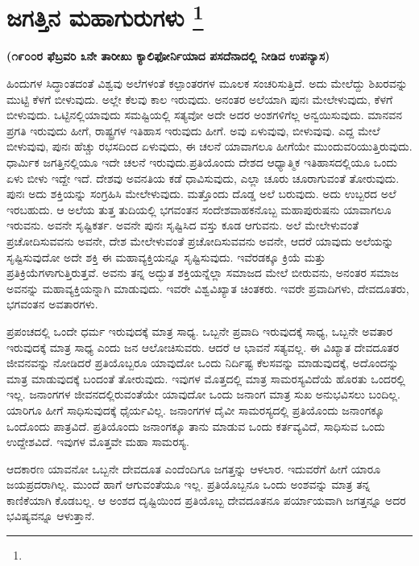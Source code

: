 
\chapter[ಜಗತ್ತಿನ ಮಹಾಗುರುಗಳು]{ಜಗತ್ತಿನ ಮಹಾಗುರುಗಳು \protect\footnote{}}

\begin{center}
\textbf{(೧೯೦೦ರ ಫೆಬ್ರವರಿ ೩ನೇ ತಾರೀಖು ಕ್ಯಾಲಿಫೋರ್ನಿಯಾದ ಪಸದೆನಾದಲ್ಲಿ ನೀಡಿದ ಉಪನ್ಯಾಸ)}
\end{center}

ಹಿಂದುಗಳ ಸಿದ್ಧಾಂತದಂತೆ ವಿಶ್ವವು ಅಲೆಗಳಂತೆ ಕಲ್ಪಾಂತರಗಳ ಮೂಲಕ ಸಂಚರಿಸು\-ತ್ತಿದೆ. ಅದು ಮೇಲೆದ್ದು ಶಿಖರವನ್ನು ಮುಟ್ಟಿ ಕೆಳಗೆ ಬೀಳುವುದು. ಅಲ್ಲೇ ಕೆಲವು ಕಾಲ ಇರುವುದು. ಅನಂತರ ಅಲೆಯಾಗಿ ಪುನಃ ಮೇಲೇಳುವುದು, ಕೆಳಗೆ ಬೀಳುವುದು. ಒಟ್ಟಿನಲ್ಲಿ\break ಯಾವುದು ಸಮಷ್ಟಿಯಲ್ಲಿ ಸತ್ಯವೋ ಅದೇ ಅದರ ಅಂಶಗಳಿಗೆಲ್ಲ ಅನ್ವಯಿಸುವುದು. ಮಾನ\-ವನ ಪ್ರಗತಿ ಇರುವುದು ಹೀಗೆ, ರಾಷ್ಟ್ರಗಳ ಇತಿಹಾಸ ಇರುವುದು ಹೀಗೆ. ಅವು ಏಳುವುವು, ಬೀಳುವುವು. ಎದ್ದ ಮೇಲೆ ಬೀಳುವುವು, ಪುನಃ ಹೆಚ್ಚು ರಭಸದಿಂದ ಏಳುವುದು, ಈ ಚಲನೆ ಯಾವಾಗಲೂ ಹೀಗೆಯೇ ಮುಂದುವರಿಯುತ್ತಿರುವುದು. ಧಾರ್ಮಿಕ ಜಗತ್ತಿನಲ್ಲಿಯೂ ಇದೇ ಚಲನೆ ಇರುವುದು.ಪ್ರತಿಯೊಂದು ದೇಶದ ಆಧ್ಯಾತ್ಮಿಕ ಇತಿಹಾಸದಲ್ಲಿಯೂ ಒಂದು ಏಳು ಬೀಳು ಇದ್ದೇ ಇದೆ. ದೇಶವು ಅವನತಿಯ ಕಡೆ ಧಾವಿಸುವುದು, ಎಲ್ಲಾ ಚೂರು ಚೂರಾಗುವಂತೆ ತೋರುವುದು. ಪುನಃ ಅದು ಶಕ್ತಿಯನ್ನು ಸಂಗ್ರಹಿಸಿ ಮೇಲೇಳುವುದು. ಮತ್ತೊಂದು ದೊಡ್ಡ ಅಲೆ ಬರುವುದು. ಅದು ಉಬ್ಬರದ ಅಲೆ ಇರಬಹುದು. ಆ ಅಲೆಯ ತುತ್ತ ತುದಿಯಲ್ಲಿ ಭಗವಂತನ ಸಂದೇಶವಾಹಕನೊಬ್ಬ ಮಹಾಪುರುಷನು ಯಾವಾಗಲೂ ಇರುವನು. ಅವನೇ ಸೃಷ್ಟಿಕರ್ತ. ಅವನೇ ಪುನಃ ಸೃಷ್ಟಿಸಿದ ವಸ್ತು ಕೂಡ ಆಗುವನು. ಅಲೆ ಮೇಲೇಳುವಂತೆ ಪ್ರಚೋದಿಸುವವನು ಅವನೇ, ದೇಶ ಮೇಲೇಳುವಂತೆ ಪ್ರಚೋದಿಸು\-ವವನು ಅವನೇ, ಆದರೆ ಯಾವುದು ಅಲೆಯನ್ನು ಸೃಷ್ಟಿಸುವುದೋ ಅದೇ ಶಕ್ತಿ ಈ ಮಹಾವ್ಯಕ್ತಿಯನ್ನೂ ಸೃಷ್ಟಿಸುವುದು. ಇವೆರಡಕ್ಕೂ ಕ್ರಿಯೆ ಮತ್ತು ಪ್ರತಿಕ್ರಿಯೆಗಳಾಗುತ್ತಿರುತ್ತವೆ. ಅವನು ತನ್ನ ಅದ್ಭುತ ಶಕ್ತಿಯನ್ನೆಲ್ಲಾ ಸಮಾಜದ ಮೇಲೆ ಬೀರುವನು, ಅನಂತರ ಸಮಾಜ ಅವನನ್ನು ಮಹಾವ್ಯಕ್ತಿಯನ್ನಾಗಿ ಮಾಡುವುದು. ಇವರೇ ವಿಶ್ವವಿಖ್ಯಾತ ಚಿಂತಕರು. ಇವರೇ ಪ್ರವಾದಿಗಳು, ದೇವದೂತರು, ಭಗವಂತನ ಅವತಾರಗಳು.

ಪ್ರಪಂಚದಲ್ಲಿ ಒಂದೇ ಧರ್ಮ ಇರುವುದಕ್ಕೆ ಮಾತ್ರ ಸಾಧ್ಯ. ಒಬ್ಬನೇ ಪ್ರವಾದಿ ಇರುವುದಕ್ಕೆ ಸಾಧ್ಯ, ಒಬ್ಬನೇ ಅವತಾರ ಇರುವುದಕ್ಕೆ ಮಾತ್ರ ಸಾಧ್ಯ ಎಂದು ಜನ ಆಲೋಚಿಸುವರು. ಆದರೆ ಆ ಭಾವನೆ ಸತ್ಯವಲ್ಲ. ಈ ವಿಖ್ಯಾತ ದೇವದೂತರ ಜೀವನವನ್ನು ನೋಡಿದರೆ ಪ್ರತಿಯೊಬ್ಬರೂ ಯಾವುದೋ ಒಂದು ನಿರ್ದಿಷ್ಟ ಕೆಲಸವನ್ನು ಮಾಡುವುದಕ್ಕೆ, ಅದೊಂದನ್ನು ಮಾತ್ರ ಮಾಡುವುದಕ್ಕೆ ಬಂದಂತೆ ತೋರುವುದು. ಇವುಗಳ ಮೊತ್ತದಲ್ಲಿ ಮಾತ್ರ ಸಾಮರಸ್ಯವಿದೆಯೆ ಹೊರತು ಒಂದರಲ್ಲಿ ಇಲ್ಲ. ಜನಾಂಗಗಳ ಜೀವನದಲ್ಲಿರುವಂತೆಯೇ ಯಾವುದೋ ಒಂದು ಜನಾಂಗ ಮಾತ್ರ ಸುಖ ಅನುಭವಿಸಲು ಬಂದಿಲ್ಲ. ಯಾರಿಗೂ ಹೀಗೆ ಸಾಧಿಸುವುದಕ್ಕೆ ಧೈರ್ಯವಿಲ್ಲ. ಜನಾಂಗಗಳ ದೈವೀ ಸಾಮರಸ್ಯದಲ್ಲಿ ಪ್ರತಿಯೊಂದು ಜನಾಂಗಕ್ಕೂ ಒಂದೊಂದು ಪಾತ್ರವಿದೆ. ಪ್ರತಿಯೊಂದು ಜನಾಂಗಕ್ಕೂ ತಾನು ಮಾಡುವ ಒಂದು ಕರ್ತವ್ಯವಿದೆ, ಸಾಧಿಸುವ ಒಂದು ಉದ್ದೇಶವಿದೆ. ಇವುಗಳ ಮೊತ್ತವೇ ಮಹಾ ಸಾಮರಸ್ಯ.

ಆದಕಾರಣ ಯಾವನೋ ಒಬ್ಬನೇ ದೇವದೂತ ಎಂದೆಂದಿಗೂ ಜಗತ್ತನ್ನು ಆಳಲಾರ. ಇದುವರೆಗೆ ಹೀಗೆ ಯಾರೂ ಜಯಪ್ರದರಾಗಿಲ್ಲ. ಮುಂದೆ ಹಾಗೆ ಆಗುವಂತೆಯೂ ಇಲ್ಲ. ಪ್ರತಿಯೊಬ್ಬನೂ ಒಂದು ಅಂಶವನ್ನು ಮಾತ್ರ ತನ್ನ ಕಾಣಿಕೆಯಾಗಿ ಕೊಡಬಲ್ಲ. ಆ ಅಂಶದ ದೃಷ್ಟಿಯಿಂದ ಪ್ರತಿಯೊಬ್ಬ ದೇವದೂತನೂ ಪರ್ಯಾಯವಾಗಿ ಜಗತ್ತನ್ನೂ ಅದರ ಭವಿಷ್ಯವನ್ನೂ ಆಳುತ್ತಾನೆ.

